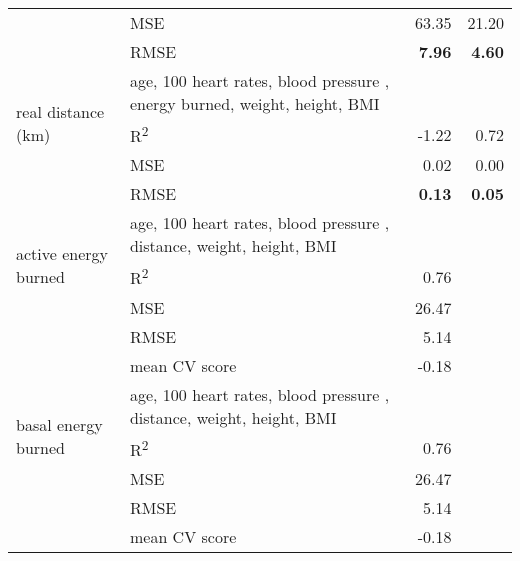 \begin{longtable}{llrr}
    & MSE & 63.35&21.20\\
    & RMSE & \textbf{7.96} &\textbf{4.60}\\
    \hline
    \multirow{3}{*}{real distance (km)} 
    & age, 100 heart rates, blood pressure , energy burned, weight, height, BMI & &\\
    & R\textsuperscript{2} & -1.22&0.72\\
    & MSE & 0.02 &0.00\\
    & RMSE & \textbf{0.13} &\textbf{0.05}\\
    \hline
    \multirow{3}{*}{active energy burned}   
    & age, 100 heart rates, blood pressure , distance, weight, height, BMI & &\\
    & R\textsuperscript{2} & 0.76 \\
    & MSE & 26.47 \\
   & RMSE & 5.14 \\
   & mean CV score & -0.18 \\
    \hline
    \multirow{3}{*}{basal energy burned}   
    & age, 100 heart rates, blood pressure , distance, weight, height, BMI & &\\
    & R\textsuperscript{2} & 0.76 \\
    & MSE & 26.47 \\
   & RMSE & 5.14 \\
   & mean CV score & -0.18 \\
    \bottomrule
\end{longtable}

\normalsize
